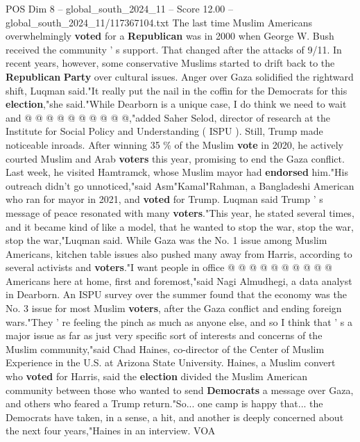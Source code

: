\begin{textsample}{POS Dim 8 – global\_south\_2024\_11 – Score 12.00 – global\_south\_2024\_11/117367104.txt}
The last time Muslim Americans overwhelmingly \textbf{voted} for a \textbf{Republican} was in 2000 when George W.
Bush received the community ' s support.
That changed after the attacks of 9/11.
In recent years, however, some conservative Muslims started to drift back to the \textbf{Republican} \textbf{Party} over cultural issues.
Anger over Gaza solidified the rightward shift, Luqman said."It really put the nail in the coffin for the Democrats for this \textbf{election},"she said."While Dearborn is a unique case, I do think we need to wait and @ @ @ @ @ @ @ @ @ @,"added Saher Selod, director of research at the Institute for Social Policy and Understanding ( ISPU ).
Still, Trump made noticeable inroads.
After winning 35 \% of the Muslim \textbf{vote} in 2020, he actively courted Muslim and Arab \textbf{voters} this year, promising to end the Gaza conflict.
Last week, he visited Hamtramck, whose Muslim mayor had \textbf{endorsed} him."His outreach didn't go unnoticed,"said Asm"Kamal"Rahman, a Bangladeshi American who ran for mayor in 2021, and \textbf{voted} for Trump.
Luqman said Trump ' s message of peace resonated with many \textbf{voters}."This year, he stated several times, and it became kind of like a model, that he wanted to stop the war, stop the war, stop the war,"Luqman said.
While Gaza was the No. 1 issue among Muslim Americans, kitchen table issues also pushed many away from Harris, according to several activists and \textbf{voters}."I want people in office @ @ @ @ @ @ @ @ @ @ Americans here at home, first and foremost,"said Nagi Almudhegi, a data analyst in Dearborn.
An ISPU survey over the summer found that the economy was the No. 3 issue for most Muslim \textbf{voters}, after the Gaza conflict and ending foreign wars."They ' re feeling the pinch as much as anyone else, and so I think that ' s a major issue as far as just very specific sort of interests and concerns of the Muslim community,"said Chad Haines, co-director of the Center of Muslim Experience in the U.S. at Arizona State University.
Haines, a Muslim convert who \textbf{voted} for Harris, said the \textbf{election} divided the Muslim American community between those who wanted to send \textbf{Democrats} a message over Gaza, and others who feared a Trump return."So... one camp is happy that... the Democrats have taken, in a sense, a hit, and another is deeply concerned about the next four years,"Haines in an interview.
VOA

\end{textsample}
